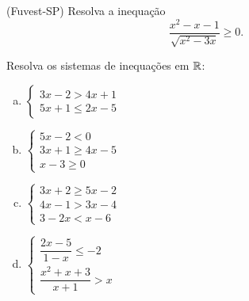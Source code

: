 \begin{secExercicios}
\begin{exer}
    (Fuvest-SP) Resolva a inequação
    \begin{equation*}
        \frac{x^2-x-1}{\sqrt{x^2-3x}}\geq 0.
    \end{equation*}
\end{exer}

\begin{exer}
    Resolva os sistemas de inequações em $\mathbb{R}$:
    \begin{enumerate}[a)]
        \item  $\left\{
        \begin{matrix}
            3x-2 > 4x+1\\
            5x+1 \leq 2x-5
        \end{matrix}
    \right.$
        \item $\left\{
        \begin{matrix}
            5x-2 <0\\
            3x+1 \geq 4x-5\\
            x-3 \geq 0
        \end{matrix}
    \right.
    $
        \item $\left\{
        \begin{matrix}
            3x+2 \geq 5x - 2\\
            4x-1 > 3x-4\\
            3-2x < x-6
        \end{matrix}
    \right.$
        \item  $\left\{
        \begin{matrix}
            \dfrac{2x-5}{1-x} \leq -2\\
            \dfrac{x^2 + x + 3}{x+1} > x
        \end{matrix}
    \right.$
    \end{enumerate}
\end{exer}
\end{secExercicios}

